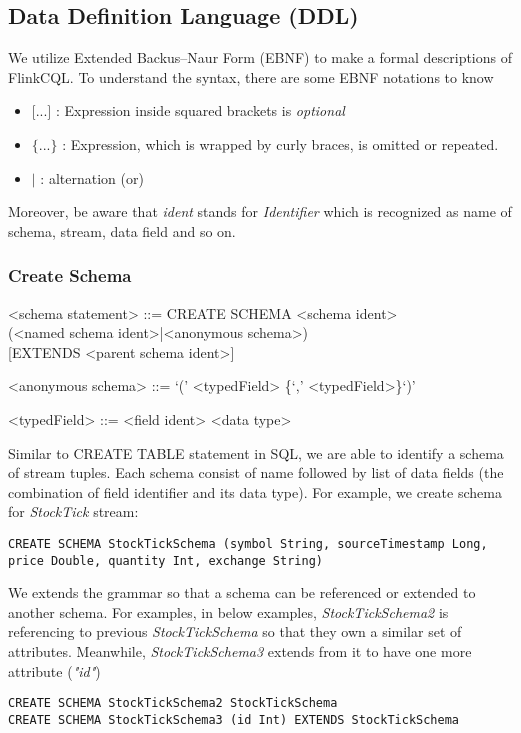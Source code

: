 \subsection{Data Definition Language (DDL)}
We utilize Extended Backus–Naur Form (EBNF) to make a formal descriptions of FlinkCQL. To understand the syntax, there are some EBNF notations to know
\begin{itemize}
	\item $\textbf{[...]}$ : Expression inside squared brackets is \textit{optional}
	\item $\textbf{\{...\}}$ : Expression, which is wrapped by curly braces, is omitted or repeated. 
	\item $\textbf{|}$ : alternation (or)
\end{itemize} 
Moreover, be aware that \textit{ident} stands for \textit{Identifier} which is recognized as name of schema, stream, data field and so on.
\newpage
\subsubsection{Create Schema}

\setlength{\grammarindent}{12em} %

\begin{grammar}

<schema statement> ::= CREATE SCHEMA <schema ident> \\
(<named schema ident>|<anonymous schema>) \\
  { }[EXTENDS <parent schema ident>]

<anonymous schema> ::= `(' <typedField> \{`,' <typedField>\}`)'

<typedField> ::= <field ident> <data type>

\end{grammar}
	
Similar to CREATE TABLE statement in SQL, we are able to identify a schema of stream tuples. Each schema consist of name followed by list of data fields (the combination of field identifier and its data type). For example, we create schema for \textit{StockTick} stream:
\begin{verbatim}
CREATE SCHEMA StockTickSchema (symbol String, sourceTimestamp Long, 
price Double, quantity Int, exchange String)
\end{verbatim}

We extends the grammar so that a schema can be referenced or extended to another schema. For examples, in below examples, \textit{StockTickSchema2} is referencing to previous \textit{StockTickSchema} so that they own a similar set of attributes. Meanwhile, \textit{StockTickSchema3} extends from it to have one more attribute (\textit{"id"})
\begin{verbatim}
CREATE SCHEMA StockTickSchema2 StockTickSchema
CREATE SCHEMA StockTickSchema3 (id Int) EXTENDS StockTickSchema
\end{verbatim}


